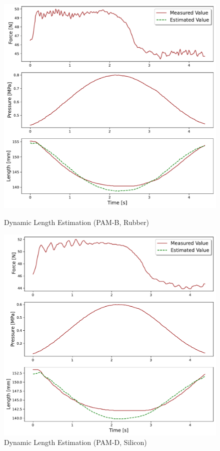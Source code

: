 \begin{figure}[h]
    \begin{center}
        \begin{minipage}[t]{\columnwidth} 
            \centering
            \includegraphics[keepaspectratio, width=\columnwidth]{fig/20231207_1_4s_by_5_2d_ieeesensors2.pdf}
            \caption{Dynamic Length Estimation (PAM-B, Rubber)}
            \label{fig:pam_b_dynamic}
        \end{minipage}
        \hfill
        \begin{minipage}[t]{\columnwidth} 
            \centering
            \includegraphics[keepaspectratio, width=\columnwidth]{fig/20231220_2_s_by_2_2d_ieeesensors2.pdf}
            \caption{Dynamic Length Estimation (PAM-D, Silicon)}
            \label{fig:pam_d_dynamic}
        \end{minipage}
    \end{center}
 \end{figure} 
